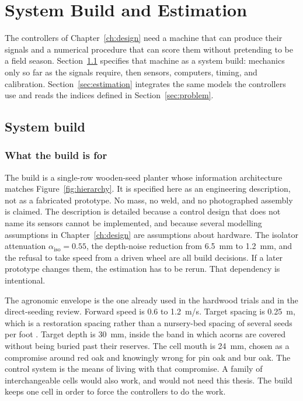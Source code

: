\chapter{System Build and Estimation}
\label{ch:estimate}

The controllers of Chapter~\ref{ch:design} need a machine that can produce their signals and a numerical procedure that can score them without pretending to be a field season. Section~\ref{sec:build} specifies that machine as a system build: mechanics only so far as the signals require, then sensors, computers, timing, and calibration. Section~\ref{sec:estimation} integrates the same models the controllers use and reads the indices defined in Section~\ref{sec:problem}.

\section{System build}
\label{sec:build}

\subsection{What the build is for}

The build is a single-row wooden-seed planter whose information architecture matches Figure~\ref{fig:hierarchy}. It is specified here as an engineering description, not as a fabricated prototype. No mass, no weld, and no photographed assembly is claimed. The description is detailed because a control design that does not name its sensors cannot be implemented, and because several modelling assumptions in Chapter~\ref{ch:design} are assumptions about hardware. The isolator attenuation $\alpha_{\mathrm{iso}}=0.55$, the depth-noise reduction from 6.5~mm to 1.2~mm, and the refusal to take speed from a driven wheel are all build decisions. If a later prototype changes them, the estimation has to be rerun. That dependency is intentional.

The agronomic envelope is the one already used in the hardwood trials and in the direct-seeding review. Forward speed is 0.6 to 1.2~m/s. Target spacing is 0.25~m, which is a restoration spacing rather than a nursery-bed spacing of several seeds per foot \cite{dinkel1991,lof2019}. Target depth is 30~mm, inside the band in which acorns are covered without being buried past their reserves. The cell mouth is 24~mm, chosen as a compromise around red oak and knowingly wrong for pin oak and bur oak. The control system is the means of living with that compromise. A family of interchangeable cells would also work, and would not need this thesis. The build keeps one cell in order to force the controllers to do the work.

